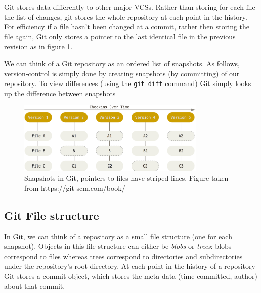 \documentclass[12pt,twoside,notitlepage]{report}
\begin{document}
Git stores data differently to other major VCSs. Rather than storing for each file the list of changes, git stores the whole repository at each  point in the history. For efficiency if a file hasn't been changed at a commit, rather then storing the file again, Git only stores a pointer to the last identical file in the previous revision as in figure \ref{snapshot_git}.

We can think of a Git repository as an ordered list of snapshots. As follows, version-control is simply done by creating snapshots (by committing) of our repository. To view differences (using the \texttt{git diff} command) Git simply looks up the difference between snapshots
\begin{figure}[h]
\includegraphics[width=0.8\textwidth]{snapshots_git.png}
\centering
\captionsetup{width=0.8\textwidth}

\caption[Snapshots in Git]{Snapshots in Git, pointers to files have striped lines. Figure taken from https://git-scm.com/book/}
\label{snapshot_git}
\end{figure}
\subsection{Git File structure}
In Git, we can think of a repository as a small file structure (one for each snapshot). Objects in this file structure can either be \textit{blobs} or \textit{trees}: blobs correspond to files whereas trees correspond to directories and subdirectories under the repository's root directory. At each point in the history of a repository Git stores a commit object, which stores the meta-data (time committed, author) about that commit.
\end{document}
